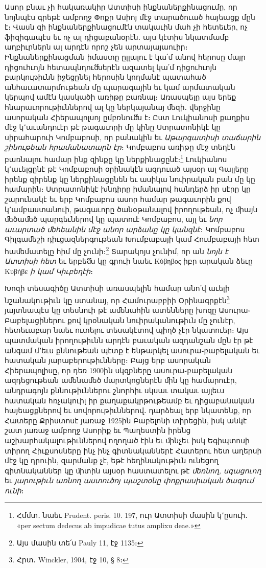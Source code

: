 \documentclass{article}
\begin{document}
{Ասոր բնաւ չի հակառակիր Ատտիսի ինքնաներքինացումը, որ նոյնպէս գրեթէ ամբողջ Փոքր Ասիոյ մէջ տարածուած հայեացք մըն է։ Վասն զի ինքնաներքինացումէն տակաւին մահ չի հետեւեր, ոչ ֆիզիգապէս եւ ոչ ալ դիցաբանօրէն․ այս կէտիս նկատմամբ աղբիւրներն ալ արդէն որոշ չեն արտայայաուիր։ Ինքնաներքինացման իմաստը ըլլալու է կա՛մ անով հերոսը մայր դիցուհւոյն հետապնդուﬓերէն ազատել կա՛մ դիցուհւոյն բարկութիւնն իջեցընել հերոսին կողմանէ պատահած անհաւատարմութեան մը պարագային եւ կամ արմատական կերպով ամէն կասկածի առիթը բառնալ։ Առասպելը այս երեք հնարաւորութիւններով ալ կը ներկայանայ ﬔզի․ վերջինը ասորական Հիերապոլսոյ ըմբռնուﬓ է։ Ըստ Լուկիանոսի քաղքիս մէջ կ՚աւանդուէր թէ թագաւորի մը կինը Ստրատոնիկէ կը սիրահարուի Կոմբաբոսի, որ բանակին եւ \emph{Աթարգատիսի տաճարին շինութեան հրամանատարն էր}։ Կոմբաբոս առիթը մէջ տեղէն բառնալու համար ինք զինքը կը ներքինացընէ։\footnote{Հմմտ․ նաեւ Prudent. peris. 10. 197, ուր Ատտիսի մասին կ՚ըսուի․ «per sectum dedecus ab impudicae tutus amplixu deae.»} Լուկիանոս կ՚աւելցընէ թէ Կոմբաբոսի օրինակէն ազդուած այսօր ալ Գալլերը իրենք զիրենք կը ներքինացընեն եւ ասիկա նուիրական բան մը կը համարին։ Ստրատոնիկէ խնդիրը իմանալով հանդերձ իր սէրը կը շարունակէ եւ երբ Կոմբաբոս ասոր համար թագաւորին քով կ՚ամբաստանուի, թագաւորը ծանօթանալով իրողութեան, ոչ ﬕայն ﬔծաﬔծ պարգեւներով կը պատուէ Կոմբաբոս, այլ եւ \emph{նոր աւարտած ﬔհեանին մէջ անոր արձանը կը կանզնէ}։ Կոմբաբոս Գիլգաﬔշի դիւցազներգութեան Խումբաբայի կամ Հումբաբայի հետ հաﬔմատելը հիմ մը չունի։\footnote{Այս մասին տե՛ս Pauly 11, էջ 1135։} Տարակոյս չունիմ, որ ան \emph{նոյն է Ատտիսի հետ} եւ երբեﬓ կը գրուի նաեւ Κύβηβος իբր արական ձեւը Κυβήβε \emph{ի կամ Կիւբեղէի}։

Խոզի տեսագիծը Ատտիսի առասպելին համար անո՛վ աւելի նշանակութիւն կը ստանայ, որ Համուրաբբիի Օրինագրքէն\footnote{Հրտ․ Winckler, 1904, էջ 10, § 8։} յայտնապէս կը տեսնուի թէ աﬔնահին ատենները խոզը Ասուրա֊Բաբելացիներու քով կրօնական նուիրականութիւն մը չունէր, հետեւաբար նաեւ ուտելու տեսակէտով պիղծ չէր նկատուեր։ Այս պատմական իրողութիւնն արդէն բաւական ազդանշան մըն էր թէ անգամ մ՚եւս քննութեան պէտք է ենթարկել ասուրա֊բաբելական եւ հատական յարաբերութիւնները։ Բայց երբ ասորական Հիերապոլիսը, որ դեռ 1900ին սկզբները ասուրա֊բաբելական ազդեցութեան աﬔնաﬔծ մարտկոցներէն ﬕն կը համարուէր, անդրագոյն քննութիւններու շնորհիւ սկսաւ տակաւ այլեւս հատական հռչակուիլ իր քաղաքակրթութեամբ եւ դիցաբանական հայեացքներով եւ սովորութիւններով․ դարձեալ երբ նկատենք, որ Հատերը Քրիստոսէ յառաջ 1925ին Բաբելոնի տիրեցին, իսկ անկէ շատ յառաջ ամբողջ Ասորիք եւ Պաղեստին իրենց աշխարհակալութիւններով ողողած էին եւ ﬕնչեւ իսկ Եգիպտոսի տիրող Հիւքսոսները ինչ ինչ գիտնականներէ Հատերու հետ աղերսի մէջ կը դրուին, զարմանք չէ, եթէ հեղինակութիւն ունեցող գիտնականներ կը ﬕտին այսօր հաստատելու թէ \emph{ﬔռնող, սգացուող} եւ \emph{յարութիւն առնող աստուծոյ պաշտօնը փոքրասիական ծագում ունի}։

}
\end{document}
